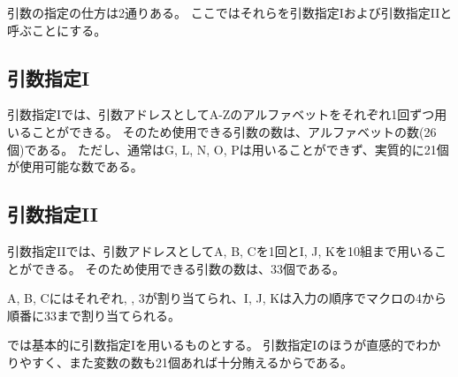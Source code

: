 

引数の指定の仕方は2通りある。
ここではそれらを引数指定Iおよび引数指定IIと呼ぶことにする。


\subsection{引数指定I}
引数指定Iでは、引数アドレスとしてA-Zのアルファベットをそれぞれ1回ずつ用いることができる。
そのため使用できる引数の数は、アルファベットの数(26個)である。
ただし、通常はG, L, N, O, Pは用いることができず、実質的に21個が使用可能な数である。


\subsection{引数指定II}
引数指定IIでは、引数アドレスとしてA, B, Cを1回とI, J, Kを10組まで用いることができる。
そのため使用できる引数の数は、33個である。

A, B, Cにはそれぞれ, , \ttNum3が割り当てられ、I, J, Kは入力の順序でマクロの\ttNum4から順番に\ttNum33まで割り当てられる。


\clearpage
\DMname では基本的に引数指定Iを用いるものとする。
引数指定Iのほうが直感的でわかりやすく、また変数の数も21個あれば十分賄えるからである。\\

